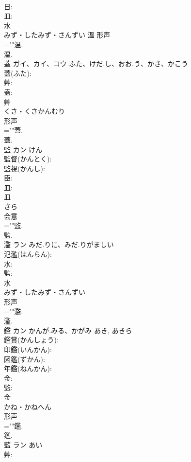 \documentclass[8pt]{extreport}
\begin{document}
\begin{CJK}{UTF8}{min}
\\	日: 
\\	皿: 
\\	水	
\\	みず・したみず・さんずい	溫	形声 
\\	=""温.
\\	温.
\\	蓋	ガイ、カイ、コウ	ふた、けだ.し、おお.う、かさ、かこう		
\\	蓋(ふた): 
\\	艸: 
\\	盍: 
\\	艸	
\\	くさ・くさかんむり	
\\	形声 
\\	=""蓋.
\\	蓋.
\\	監	カン		けん	
\\	監督(かんとく): 
\\	監視(かんし): 
\\	臣: 
\\	皿: 
\\	皿	
\\	さら	
\\	会意 
\\	=""監.
\\	監.
\\	濫	ラン	みだ.りに、みだ.りがましい		
\\	氾濫(はんらん): 
\\	水: 
\\	監: 
\\	水	
\\	みず・したみず・さんずい	
\\	形声 
\\	=""濫.
\\	濫.
\\	鑑	カン	かんが.みる、かがみ	あき, あきら	
\\	鑑賞(かんしょう): 
\\	印鑑(いんかん): 
\\	図鑑(ずかん): 
\\	年鑑(ねんかん): 
\\	金: 
\\	監: 
\\	金	
\\	かね・かねへん	
\\	形声 
\\	=""鑑.
\\	鑑.
\\	藍	ラン	あい		
\\	艸: 

\end{CJK}
\end{document}
